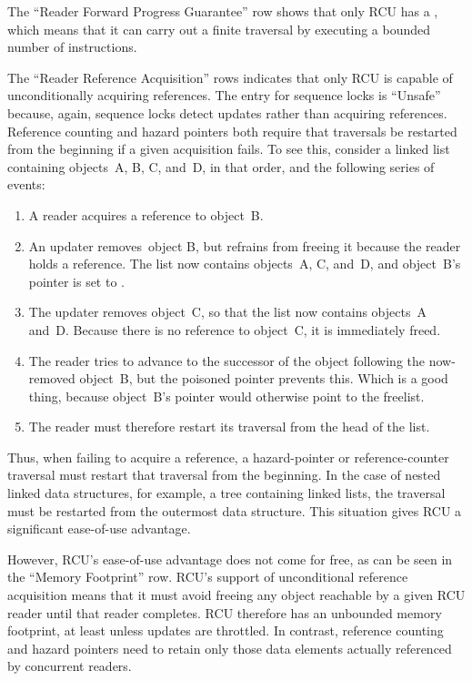 The ``Reader Forward Progress Guarantee'' row shows that only RCU
has a 
, which means that
it can carry out a finite traversal by executing a bounded number of
instructions.

The ``Reader Reference Acquisition'' rows indicates that only RCU is
capable of unconditionally acquiring references.
The entry for sequence locks is ``Unsafe'' because, again, sequence locks
detect updates rather than acquiring references.
Reference counting and hazard pointers both require that traversals be
restarted from the beginning if a given acquisition fails.
To see this, consider a linked list containing objects~A, B, C, and~D,
in that order, and the following series of events:

\begin{enumerate}
\item	A reader acquires a reference to object~B.
\item	An updater removes~object B, but refrains from freeing it because
	the reader holds a reference.
	The list now contains objects~A, C, and~D, and
	object~B's  pointer is set to .
\item	The updater removes object~C, so that the list now contains
	objects~A and~D\@.
	Because there is no reference to object~C, it is immediately freed.
\item	The reader tries to advance to the successor of the object
	following the now-removed object~B, but the poisoned
	 pointer prevents this.
	Which is a good thing, because object~B's  pointer
	would otherwise point to the freelist.
\item	The reader must therefore restart its traversal from the head
	of the list.
\end{enumerate}

Thus, when failing to acquire a reference, a hazard-pointer or
reference-counter traversal must restart that traversal from the
beginning.
In the case of nested linked data structures, for example, a
tree containing linked lists, the traversal must be restarted from
the outermost data structure.
This situation gives RCU a significant ease-of-use advantage.

However, RCU's ease-of-use advantage does not come
for free, as can be seen in the ``Memory Footprint'' row.
RCU's support of unconditional reference acquisition means that
it must avoid freeing any object reachable by a given
RCU reader until that reader completes.
RCU therefore has an unbounded memory footprint, at least unless updates
are throttled.
In contrast, reference counting and hazard pointers need to  retain only
those data elements actually referenced by concurrent readers.

